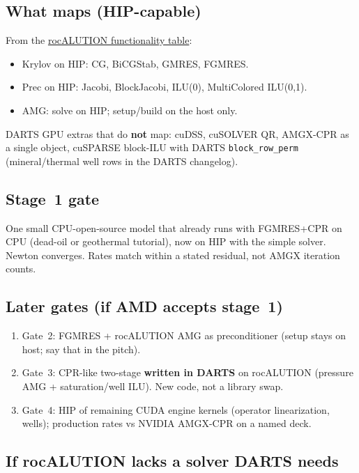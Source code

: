 \documentclass[11pt,a4paper]{article}
\begin{document}
\subsection*{What maps (HIP-capable)}

From the
\href{https://rocm.docs.amd.com/projects/rocALUTION/en/latest/reference/rocALUTION-functionality-table.html}{rocALUTION functionality table}:

\begin{itemize}
\item Krylov on HIP: CG, BiCGStab, GMRES, FGMRES.
\item Prec on HIP: Jacobi, BlockJacobi, ILU(0), MultiColored ILU(0,1).
\item AMG: solve on HIP; setup/build on the host only.
\end{itemize}

DARTS GPU extras that do \textbf{not} map: cuDSS, cuSOLVER QR,
AMGX-CPR as a single object, cuSPARSE block-ILU with DARTS \texttt{block\_row\_perm}
(mineral/thermal well rows in the DARTS changelog).

\subsection*{Stage~1 gate}

One small CPU-open-source model that already runs with FGMRES+CPR on CPU
(dead-oil or geothermal tutorial), now on HIP with the simple solver.
Newton converges.
Rates match within a stated residual, not AMGX iteration counts.

\subsection*{Later gates (if AMD accepts stage~1)}

\begin{enumerate}
\item Gate~2: FGMRES + rocALUTION AMG as preconditioner (setup stays on host; say that in the pitch).
\item Gate~3: CPR-like two-stage \textbf{written in DARTS} on rocALUTION
(pressure AMG + saturation/well ILU). New code, not a library swap.
\item Gate~4: HIP of remaining CUDA engine kernels (operator linearization, wells);
production rates vs NVIDIA AMGX-CPR on a named deck.
\end{enumerate}

\subsection*{If rocALUTION lacks a solver DARTS needs}
\end{document}
